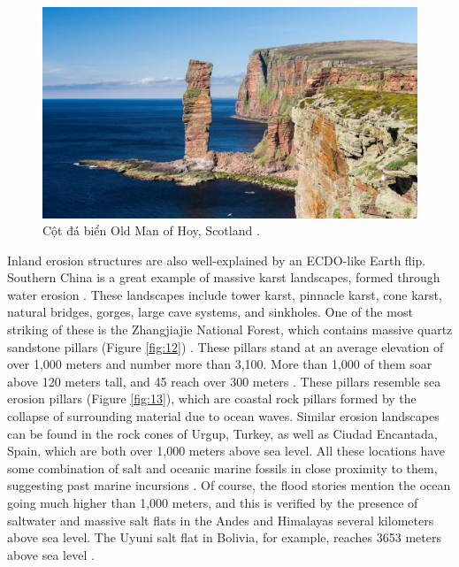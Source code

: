 \documentclass[10pt,twocolumn,letterpaper]{article}
\begin{document}
\begin{figure}[b]
\begin{center}
   \includegraphics[width=1\linewidth]{hoy.jpg}
\end{center}
   \caption{Cột đá biển Old Man of Hoy, Scotland \cite{83}.}
\label{fig:13}
\label{fig:onecol}
\end{figure}
Inland erosion structures are also well-explained by an ECDO-like Earth flip. Southern China is a great example of massive karst landscapes, formed through water erosion \cite{82}. These landscapes include tower karst, pinnacle karst, cone karst, natural bridges, gorges, large cave systems, and sinkholes. One of the most striking of these is the Zhangjiajie National Forest, which contains massive quartz sandstone pillars (Figure \ref{fig:12}) \cite{84}. These pillars stand at an average elevation of over 1,000 meters and number more than 3,100. More than 1,000 of them soar above 120 meters tall, and 45 reach over 300 meters \cite{85}. These pillars resemble sea erosion pillars (Figure \ref{fig:13}), which are coastal rock pillars formed by the collapse of surrounding material due to ocean waves. Similar erosion landscapes can be found in the rock cones of Urgup, Turkey, as well as Ciudad Encantada, Spain, which are both over 1,000 meters above sea level. All these locations have some combination of salt and oceanic marine fossils in close proximity to them, suggesting past marine incursions \cite{15,86,87}. Of course, the flood stories \cite{3} mention the ocean going much higher than 1,000 meters, and this is verified by the presence of saltwater and massive salt flats in the Andes and Himalayas several kilometers above sea level. The Uyuni salt flat in Bolivia, for example, reaches 3653 meters above sea level \cite{94}.
\end{document}

